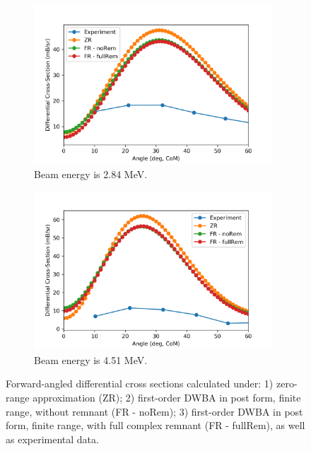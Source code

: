  \begin{figure}[tb]
    \begin{subfigure}{0.5\textwidth}
		\centering
		\includegraphics[width=0.98\textwidth]{3MeVReactions.png}
		\caption{Beam energy is 2.84 MeV. }
		\label{fig:3MeV}
	\end{subfigure}
        \begin{subfigure}{0.5\textwidth}
		\centering
		\includegraphics[width=0.98\textwidth]{5MeVReactions.png}
		\caption{Beam energy is 4.51 MeV.}
		\label{fig:5MeV}
        \end{subfigure}
       \caption{Forward-angled differential cross sections calculated under: 1) zero-range approximation (ZR); 2) first-order DWBA in post form, finite range, without remnant (FR - noRem); 3) first-order DWBA in post form, finite range, with full complex remnant (FR - fullRem), as well as experimental data. }
        \label{fig:post}
  \end{figure}

